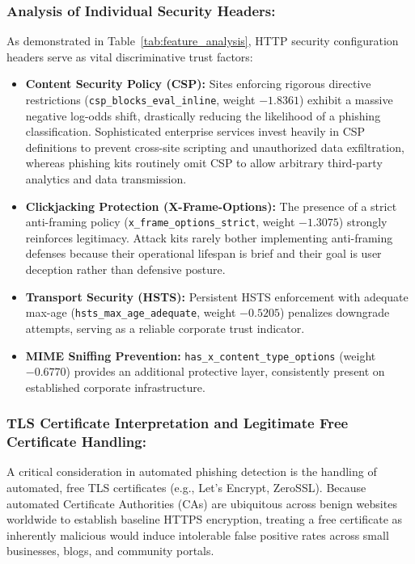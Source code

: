 \documentclass[conference]{IEEEtran}
\begin{document}
\subsubsection{Analysis of Individual Security Headers:}\label{sec-header-analysis}
As demonstrated in Table~\ref{tab:feature_analysis}, HTTP security configuration headers serve as vital discriminative trust factors:
\begin{itemize}[leftmargin=2.5em]
    \item \textbf{Content Security Policy (CSP):} Sites enforcing rigorous directive restrictions (\texttt{csp\_blocks\_eval\_inline}, weight $-1.8361$) exhibit a massive negative log-odds shift, drastically reducing the likelihood of a phishing classification. Sophisticated enterprise services invest heavily in CSP definitions to prevent cross-site scripting and unauthorized data exfiltration, whereas phishing kits routinely omit CSP to allow arbitrary third-party analytics and data transmission.
    \item \textbf{Clickjacking Protection (X-Frame-Options):} The presence of a strict anti-framing policy (\texttt{x\_frame\_options\_strict}, weight $-1.3075$) strongly reinforces legitimacy. Attack kits rarely bother implementing anti-framing defenses because their operational lifespan is brief and their goal is user deception rather than defensive posture.
    \item \textbf{Transport Security (HSTS):} Persistent HSTS enforcement with adequate max-age (\texttt{hsts\_max\_age\_adequate}, weight $-0.5205$) penalizes downgrade attempts, serving as a reliable corporate trust indicator.
    \item \textbf{MIME Sniffing Prevention:} \texttt{has\_x\_content\_type\_options} (weight $-0.6770$) provides an additional protective layer, consistently present on established corporate infrastructure.
\end{itemize}

\subsubsection{TLS Certificate Interpretation and Legitimate Free Certificate Handling:}\label{tls-cert-handling}
A critical consideration in automated phishing detection is the handling of automated, free TLS certificates (e.g., Let's Encrypt, ZeroSSL). Because automated Certificate Authorities (CAs) are ubiquitous across benign websites worldwide to establish baseline HTTPS encryption, treating a free certificate as inherently malicious would induce intolerable false positive rates across small businesses, blogs, and community portals.
\end{document}

